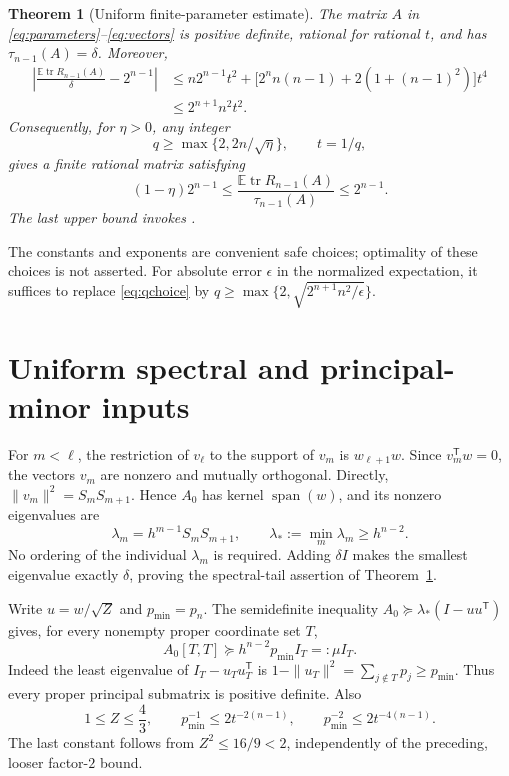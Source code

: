 \documentclass[10pt,letterpaper]{article}
\newtheorem{theorem}{Theorem}
\DeclareMathOperator{\tr}{tr}
\newcommand{\E}{\mathbb E}
\begin{document}
\begin{theorem}[Uniform finite-parameter estimate]\label{thm:quantitative}
The matrix $A$ in \eqref{eq:parameters}--\eqref{eq:vectors} is positive
definite, rational for rational $t$, and has $\tau_{n-1}(A)=\delta$.
Moreover,
\begin{align}
 \left|\frac{\E\tr R_{n-1}(A)}{\delta}-2^{n-1}\right|
 &\leq n2^{n-1}t^2+
 \bigl[2^n n(n-1)+2(1+(n-1)^2)\bigr]t^4\label{eq:finebound}\\
 &\leq 2^{n+1}n^2t^2.\label{eq:simplebound}
\end{align}
Consequently, for $\eta>0$, any integer
\begin{equation}\label{eq:qchoice}
 q\geq\max\{2,2n/\sqrt\eta\},\qquad t=1/q,
\end{equation}
gives a finite rational matrix satisfying
\begin{equation}\label{eq:relative}
 (1-\eta)2^{n-1}\leq
 \frac{\E\tr R_{n-1}(A)}{\tau_{n-1}(A)}\leq2^{n-1}.
\end{equation}
The last upper bound invokes \cite[Lemma~5.5]{CETW}.
\end{theorem}

The constants and exponents are convenient safe choices; optimality of
these choices is not asserted. For absolute error $\epsilon$ in the
normalized expectation, it suffices to replace \eqref{eq:qchoice} by
$q\geq\max\{2,\sqrt{2^{n+1}n^2/\epsilon}\}$.

\section{Uniform spectral and principal-minor inputs}\label{sec:inputs}

For $m<\ell$, the restriction of $v_\ell$ to the support of $v_m$ is
$w_{\ell+1}w$. Since $v_m^{\mathsf T}w=0$, the vectors $v_m$ are
nonzero and mutually orthogonal. Directly,
$\|v_m\|^2=S_mS_{m+1}$. Hence $A_0$ has kernel $\operatorname{span}(w)$,
and its nonzero eigenvalues are
\begin{equation}\label{eq:eigenvalues}
 \lambda_m=h^{m-1}S_mS_{m+1},\qquad
 \lambda_*:=\min_m\lambda_m\geq h^{n-2}.
\end{equation}
No ordering of the individual $\lambda_m$ is required. Adding $\delta I$
makes the smallest eigenvalue exactly $\delta$, proving the spectral-tail
assertion of Theorem~\ref{thm:quantitative}.

Write $u=w/\sqrt Z$ and $p_{\min}=p_n$. The semidefinite inequality
$A_0\succeq\lambda_*(I-uu^{\mathsf T})$ gives, for every nonempty
proper coordinate set $T$,
\begin{equation}\label{eq:principal-lower}
 A_0[T,T]\succeq h^{n-2}p_{\min}I_T=:\mu I_T.
\end{equation}
Indeed the least eigenvalue of $I_T-u_Tu_T^{\mathsf T}$ is
$1-\|u_T\|^2=\sum_{j\notin T}p_j\geq p_{\min}$.
Thus every proper principal submatrix is positive definite. Also
\begin{equation}\label{eq:pmin}
 1\leq Z\leq\frac43,\qquad
 p_{\min}^{-1}\leq2t^{-2(n-1)},\qquad
 p_{\min}^{-2}\leq2t^{-4(n-1)}.
\end{equation}
The last constant follows from $Z^2\leq16/9<2$, independently of the
preceding, looser factor-$2$ bound.
\end{document}
